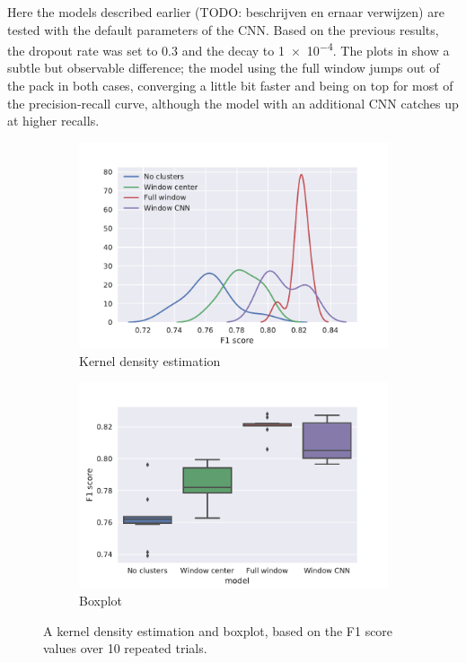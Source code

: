 Here the models described earlier (TODO: beschrijven en ernaar verwijzen) are
tested with the default parameters of the CNN\@. Based on the previous results,
the dropout rate was set to 0.3 and the decay to \num{1e-4}.
The plots in  show a subtle but observable difference; the
model using the full window jumps out of the pack in both cases, converging a
little bit faster and being on top for most of the precision-recall curve,
although the model with an additional CNN catches up at higher recalls.

\begin{figure}[htbp]
  \centering
  \begin{subfigure}[t]{0.49\textwidth}
    \centering
    \includegraphics[width=\textwidth]{./figures/results/models/kde_f1.pdf}
    \caption{Kernel density estimation}%
    \label{fig:model_kde}
  \end{subfigure}
  \begin{subfigure}[t]{0.49\textwidth}
    \centering
    \includegraphics[width=\textwidth]{./figures/results/models/boxplot_f1.pdf}
    \caption{Boxplot}%
    \label{fig:model_box}
  \end{subfigure}
  \caption{A kernel density estimation and boxplot, based on the F1 score values
  over 10 repeated trials.}%
  \label{fig:model_dists}
\end{figure}

